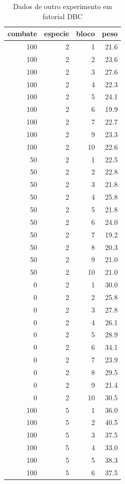 \documentclass[
]{article}
\begin{document}
\begin{table}
\caption{\label{tab:unnamed-chunk-124}Dados de outro experimento em fatorial DBC}
\centering
\begin{tabular}[t]{r|r|r|r}
\hline
combate & especie & bloco & peso\\
\hline
100 & 2 & 1 & 21.6\\
\hline
100 & 2 & 2 & 23.6\\
\hline
100 & 2 & 3 & 27.6\\
\hline
100 & 2 & 4 & 22.3\\
\hline
100 & 2 & 5 & 24.1\\
\hline
100 & 2 & 6 & 19.9\\
\hline
100 & 2 & 7 & 22.7\\
\hline
100 & 2 & 9 & 23.3\\
\hline
100 & 2 & 10 & 22.6\\
\hline
50 & 2 & 1 & 22.5\\
\hline
50 & 2 & 2 & 22.8\\
\hline
50 & 2 & 3 & 21.8\\
\hline
50 & 2 & 4 & 25.8\\
\hline
50 & 2 & 5 & 21.8\\
\hline
50 & 2 & 6 & 24.0\\
\hline
50 & 2 & 7 & 19.2\\
\hline
50 & 2 & 8 & 20.3\\
\hline
50 & 2 & 9 & 21.0\\
\hline
50 & 2 & 10 & 21.0\\
\hline
0 & 2 & 1 & 30.0\\
\hline
0 & 2 & 2 & 25.8\\
\hline
0 & 2 & 3 & 27.8\\
\hline
0 & 2 & 4 & 26.1\\
\hline
0 & 2 & 5 & 28.9\\
\hline
0 & 2 & 6 & 34.1\\
\hline
0 & 2 & 7 & 23.9\\
\hline
0 & 2 & 8 & 29.5\\
\hline
0 & 2 & 9 & 21.4\\
\hline
0 & 2 & 10 & 30.5\\
\hline
100 & 5 & 1 & 36.0\\
\hline
100 & 5 & 2 & 40.5\\
\hline
100 & 5 & 3 & 37.5\\
\hline
100 & 5 & 4 & 33.0\\
\hline
100 & 5 & 5 & 38.3\\
\hline
100 & 5 & 6 & 37.5\\
\hline

\end{tabular}
\end{table}
\end{document}

